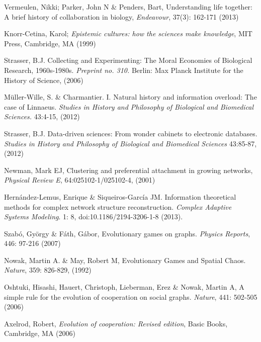 \begin{thebibliography}{50}

 Vermeulen, Nikki; Parker, John N \& Penders,
  Bart, Understanding life together: A brief history of collaboration
  in biology, \textit{Endeavour}, 37(3): 162-171 (2013) 

 Knorr-Cetina, Karol; \textit{Epistemic
  cultures: how the sciences make knowledge}, MIT Press, Cambridge, MA
  (1999) 

 Strasser, B.J. Collecting and Experimenting:
  The Moral Economies of Biological Research, 1960s-1980s.
  \textit{Preprint no. 310.} Berlin: Max Planck Institute for the
  History of Science, (2006) 

 M\"{u}ller-Wille, S. \& Charmantier. I.  Natural
  history and information overload: The case of Linnaeus.
  \textit{Studies in History and Philosophy of Biological and
    Biomedical Sciences.} 43:4-15, (2012) 

 Strasser, B.J. Data-driven sciences: From
  wonder cabinets to electronic databases. \textit{Studies in History
    and Philosophy of Biological and Biomedical Sciences} 43:85-87,
  (2012) 

 Newman, Mark EJ, Clustering and preferential
  attachment in growing networks, \textit{Physical Review E},
  64:025102-1/025102-4, (2001) 

 Hern\'andez-Lemus, Enrique \&
  Siqueiros-Garc\'ia JM. Information theoretical methods for complex
  network structure reconstruction. \textit{Complex Adaptive Systems
    Modeling}. 1: 8, doi:10.1186/2194-3206-1-8 (2013).

 Szab\'o, Gy\"{o}rgy \& F\'ath, G\'abor, Evolutionary games on graphs. \textit{Physics Reports}, 446: 97-216 (2007)

 Nowak, Martin A. \& May, Robert M, Evolutionary
  Games and Spatial Chaos. \textit{Nature}, 359: 826-829, (1992)

 Oshtuki, Hisashi, Hauert, Christoph, Lieberman, Erez \& Nowak, Martin A, A simple rule for the evolution of cooperation on social graphs. \textit{Nature}, 441: 502-505 (2006)

 Axelrod, Robert, \textit{Evolution of cooperation: Revised edition}, Basic Books, Cambridge, MA (2006)


\end{thebibliography}
